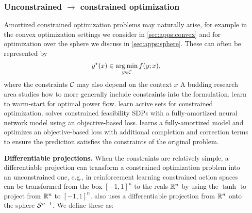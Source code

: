 \documentclass[twoside,11pt]{article}
\newcommand{\eg}{e.g.\xspace}
\begin{document}
\subsubsection{Unconstrained $\rightarrow$ constrained optimization}
\label{sec:constraints}
Amortized constrained optimization problems may naturally arise, for example
in the convex optimization settings we consider in \cref{sec:apps:convex}
and for optimization over the sphere we discuss in \cref{sec:apps:sphere}.
These can often be represented by
\begin{equation}
  y^\star(x) \in \operatorname*{arg\,min}_{y\in{\mathcal{C}}} f(y; x),
  \label{eq:opt-constrained}
\end{equation}
where the constraints ${\mathcal{C}}$ may also depend on the context $x$
A budding research area studies how to more generally include
constraints into the formulation.
\citet{baker2019learning,dong2020smart,zamzam2020learning,pan2020deepopf}
learn to warm-start for optimal power flow.
\citet{misra2021learning} learn active sets for constrained optimization.
\citet{krivachy2020fast} solves constrained feasibility SDPs
with a fully-amortized neural network model using an
objective-based loss.
\citet{donti2021dc3} learns a fully-amortized model and optimizes an
objective-based loss with additional completion and correction terms
to ensure the prediction satisfies the constraints of the original problem.

\textbf{Differentiable projections.}
When the constraints are relatively simple, a differentiable projection
can transform a constrained optimization problem into an unconstrained one,
\eg, in reinforcement learning constrained action spaces can be transformed
from the box $[-1,1]^n$ to the reals $\mathbb{R}^n$ by using
the $\tanh$ to project from $\mathbb{R}^n$ to $[-1,1]^n$.
 also uses a differentiable projection from $\mathbb{R}^n$
onto the sphere ${\mathcal{S}}^{n-1}$.
We define these as: \\
\end{document}
